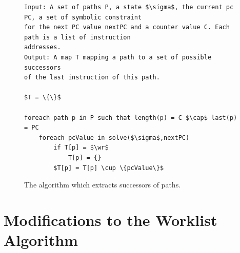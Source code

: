 \documentclass{kththesis}
\begin{document}
\begin{figure}[!htbp]
    \centering
\begin{lstlisting}[style=algorithm]
Input: A set of paths P, a state $\sigma$, the current pc PC, a set of symbolic constraint 
for the next PC value nextPC and a counter value C. Each path is a list of instruction
addresses. 
Output: A map T mapping a path to a set of possible successors 
of the last instruction of this path.

$T = \{\}$

foreach path p in P such that length(p) = C $\cap$ last(p) = PC
    foreach pcValue in solve($\sigma$,nextPC)
        if T[p] = $\wr$
            T[p] = {}    
        $T[p] = T[p] \cup \{pcValue\}$

\end{lstlisting}
\caption[The algorithm which extracts successors of paths.]{The algorithm which extracts successors of paths.}
    \label{fig:DSEextract}
\end{figure}




\section{Modifications to the Worklist Algorithm}
\end{document}
